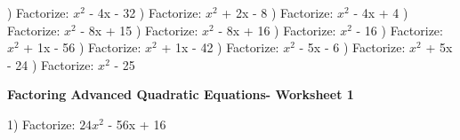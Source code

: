 \documentclass{article}%
\begin{document}
\newline%
\newline%
) Factorize: $x^2$ - 4x - 32%
\newline%
\newline%
) Factorize: $x^2$ + 2x - 8%
\newline%
\newline%
) Factorize: $x^2$ - 4x + 4%
\newline%
\newline%
) Factorize: $x^2$ - 8x + 15%
\newline%
\newline%
) Factorize: $x^2$ - 8x + 16%
\newline%
\newline%
) Factorize: $x^2$ - 16%
\newline%
\newline%
) Factorize: $x^2$ + 1x - 56%
\newline%
\newline%
) Factorize: $x^2$ + 1x - 42%
\newline%
\newline%
) Factorize: $x^2$ - 5x - 6%
\newline%
\newline%
) Factorize: $x^2$ + 5x - 24%
\newline%
\newline%
) Factorize: $x^2$ - 25%
\newline%
\newline%
\newline%
\pagebreak%
\large%
\begin{center}%
\textbf{Factoring Advanced Quadratic Equations- Worksheet 1}%
\newline%
\newline%
\newline%
\end{center} \normalsize%
1) Factorize: $24x^2$ - 56x + 16%
\newline%
\newline%
\end{document}
